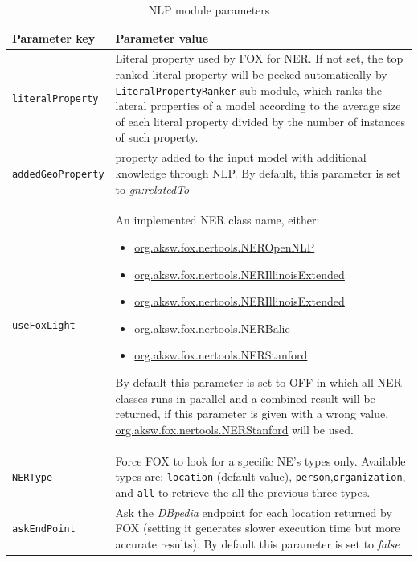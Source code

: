 \documentclass[a4paper,twoside,bibtotoc,abstracton,12pt,BCOR=15mm]{article}
\begin{document}
    \begin{table}
    \caption{NLP module parameters} \label{tbl:nlpPram}
    \small
    \begin{tabularx}{\textwidth}{@{}lX@{}}
    \toprule
    \textbf{Parameter key} 	& \textbf{Parameter value} \\
    \toprule
    \texttt{literalProperty}	& Literal property used by FOX for NER. If not set, the top ranked literal property will be pecked automatically by \texttt{LiteralPropertyRanker} sub-module, which ranks the  lateral properties of a model according to the average size of each literal property divided by the number of instances of such property.\\
    \midrule
    \texttt{addedGeoProperty}& property added to the input model with additional knowledge through NLP. By default, this parameter is set to \emph{gn:relatedTo\footnotemark[11]}\\
    \midrule
    \texttt{useFoxLight} 	& An implemented NER class name, either: 
			      \begin{itemize}
				  \itemsep-0.5em
				  \item \url{org.aksw.fox.nertools.NEROpenNLP}
				  \item \url{org.aksw.fox.nertools.NERIllinoisExtended}
				  \item \url{org.aksw.fox.nertools.NERIllinoisExtended}
				  \item \url{org.aksw.fox.nertools.NERBalie}
				  \item \url{org.aksw.fox.nertools.NERStanford}
			      \end{itemize}
			      By default this parameter is set to \url{OFF} in which all NER classes runs in parallel and a combined result will be returned, if this parameter is given with a wrong value, \url{org.aksw.fox.nertools.NERStanford} will be used. \\
    \midrule
    \texttt{NERType} 	& Force FOX to look for a specific NE's types only. Available types are: \texttt{location} (default value), \texttt{person},\texttt{organization}, and \texttt{all} to retrieve the all the previous three types.\\ 
    \midrule
    \texttt{askEndPoint} 	& Ask the \emph{DBpedia} endpoint for each location returned by FOX (setting it generates slower execution time but more accurate results). By default this parameter is set to \emph{false}\\

\end{tabularx}
\end{table}
\end{document}

